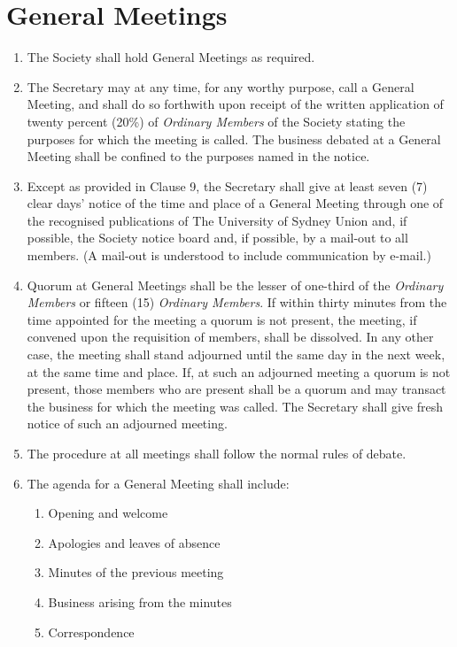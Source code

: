 \documentclass[11pt]{article}
\begin{document}
\section{General Meetings}
\begin{enumerate}[\thesection .1]
    \item The Society shall hold General Meetings as required.
    \item The Secretary may at any time, for any worthy purpose, call a General Meeting, and shall do so forthwith upon receipt of the written application of twenty percent (20\%) of \textit{Ordinary Members} of the Society stating the purposes for which the meeting is called. The business debated at a General Meeting shall be confined to the purposes named in the notice.
    \item Except as provided in Clause 9, the Secretary shall give at least seven (7) clear days’ notice of the time and place of a General Meeting through one of the recognised publications of The University of Sydney Union and, if possible, the Society notice board and, if possible, by a mail-out to all members. (A mail-out is understood to include communication by e-mail.)
    \item Quorum at General Meetings shall be the lesser of one-third of the \textit{Ordinary Members} or fifteen (15) \textit{Ordinary Members}. If within thirty minutes from the time appointed for the meeting a quorum is not present, the meeting, if convened upon the requisition of members, shall be dissolved. In any other case, the meeting shall stand adjourned until the same day in the next week, at the same time and place. If, at such an adjourned meeting a quorum is not present, those members who are present shall be a quorum and may transact the business for which the meeting was called. The Secretary shall give fresh notice of such an adjourned meeting.
    \item The procedure at all meetings shall follow the normal rules of debate.
    \item The agenda for a General Meeting shall include:
    \begin{enumerate}[\hspace{5mm}1.]
        \item Opening and welcome
    	\item Apologies and leaves of absence
    	\item Minutes of the previous meeting
    	\item Business arising from the minutes
    	\item Correspondence

\end{enumerate}
\end{enumerate}
\end{document}
